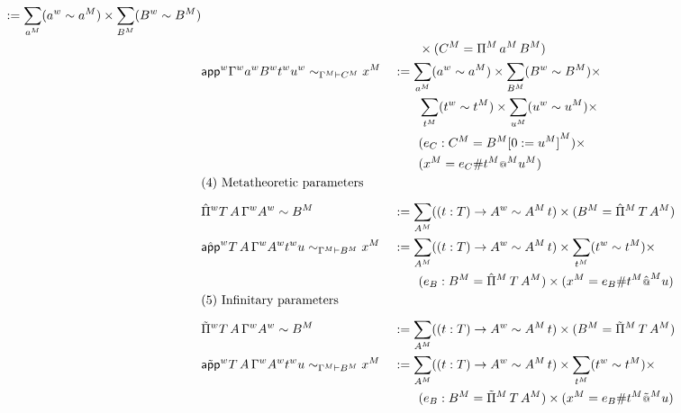 \begin{alignat*}{5}
   :=
      \sum_{\model{a}} (\wf{a}\sim\model{a})
      \times
      \sum_{\model{B}} (\wf{B}\sim\model{B})
      \\
      &&& \qquad \times (\model{C}= \model{\Pi}\,\model{a}\,\model{B})
  \\
  &
  \relt{\appw \wf{\Gamma} \wf{a} \wf{B} \wf{t} \wf{u}}{\model{\Gamma}}{\model{C}}{\model{x}}  &&
    :=
      \sum_{\model{a}} (\wf{a}\sim\model{a})
      \times
      \sum_{\model{B}} (\wf{B}\sim\model{B})
      \times
      \\
      & && \qquad
      \sum_{\model{t}} (\wf{t}\sim\model{t})
      \times
      \sum_{\model{u}} (\wf{u}\sim\model{u})
      \times
      \\
      & &&
     \qquad  (e_C : \model{C} = \model{B}\model{[0 := \model{u}]})
      \times
      \\
      & &&
      \qquad
      (\model{x} = e_C \# \model{t} \model{\oldapp}\model{u})
    \\
  & \rlap{(4) Metatheoretic parameters} \\[0.5em]
  & \Pimw T\,A\,\wf{\Gamma}\wf{A} \sim \model{B} &&
    :=
      \sum_{\model{A}} ((t : T) \ra \wf{A}\sim\model{A}\, t)
      \times
      (\model{B} = \model{\Pim}\,T\,\model{A})
    \\
    & \relt{\appmw T\,A\,\wf{\Gamma}\wf{A} \wf{t} u}{\model{\Gamma}}{\model{B}}{\model{x}}
     &&
     :=
      \sum_{\model{A}} ((t : T) \ra \wf{A}\sim\model{A}\, t)
      \times
      \sum_{\model{t}} (\wf{t}\sim\model{t})
      \times
      \\ & &&
      \qquad
      (e_B : \model{B} = \model{\Pim}\,T\,\model{A})
      \times
      (\model{x} = e_B \# \model{t}\model{\hat{\oldapp}}u)
    \\
  & \rlap{(5) Infinitary parameters} \\[0.5em]
    & \Piiw T\,A\,\wf{\Gamma}\wf{A} \sim \model{B} &&
    :=
      \sum_{\model{A}} ((t : T) \ra \wf{A}\sim\model{A}\, t)
      \times
      (\model{B} = \model{\Pii}\,T\,\model{A})
    \\
    & \relt{\appiw T\,A\,\wf{\Gamma}\wf{A} \wf{t} u}{\model{\Gamma}}{\model{B}}{\model{x}}
     &&
     :=
      \sum_{\model{A}} ((t : T) \ra \wf{A}\sim\model{A}\, t)
      \times
      \sum_{\model{t}} (\wf{t}\sim\model{t})
      \times
      \\ & &&
      \qquad
      (e_B : \model{B} = \model{\Pii}\,T\,\model{A})
      \times
      (\model{x} = e_B \# \model{t}\model{\tilde{\oldapp}}u)
\end{alignat*}

